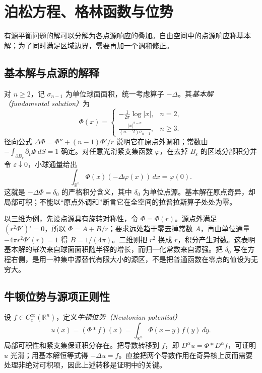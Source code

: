 \setcounter{chapter}{10} %
\chapter{泊松方程、格林函数与位势}
\label{chap:green}

有源平衡问题的解可以分解为各点源响应的叠加。自由空间中的点源响应称基本解；为了同时满足区域边界，需要再加一个调和修正。

\section{基本解与点源的解释}
对 $n\ge2$，记 $\sigma_{n-1}$ 为单位球面面积，统一考虑算子 $-\Delta$。其\emph{基本解（fundamental solution）}为
\begin{equation}
 \Phi(x)=\begin{cases}
 \displaystyle-\frac1{2\pi}\log|x|,&n=2,\\
 \displaystyle\frac{|x|^{2-n}}{(n-2)\sigma_{n-1}},&n\ge3.
 \end{cases}
 \label{eq:laplace-fundamental}
\end{equation}
径向公式 $\Delta\Phi=\Phi''+(n-1)\Phi'/r$ 说明它在原点外调和；常数由 $-\int_{\partial B_r}\partial_\nu\Phi\,dS=1$ 确定。对任意光滑紧支集函数 $\varphi$，在去掉 $B_\varepsilon$ 的区域分部积分并令 $\varepsilon\downarrow0$，小球通量给出
\[
 \int_{\mathbb R^n}\Phi(x)(-\Delta\varphi(x))\,dx=\varphi(0).
\]
这就是 $-\Delta\Phi=\delta_0$ 的严格积分含义，其中 $\delta_0$ 为单位点源。基本解在原点奇异，却局部可积；不能以“原点外调和”断言它在全空间的拉普拉斯算子处处为零。

以三维为例，先设点源具有旋转对称性，令 $\Phi=\Phi(r)$。源点外满足 $(r^2\Phi')'=0$，所以 $\Phi=A+B/r$；要求远处趋于零去掉常数 $A$，再由单位通量 $-4\pi r^2\Phi'(r)=1$ 得 $B=1/(4\pi)$。二维则把 $r^2$ 换成 $r$，积分产生对数。这表明基本解的幂次来自球面面积随半径的增长，而归一化常数来自源强。把 $\delta_0$ 写在方程右侧，是用一种集中源替代有限大小的源区，不是把普通函数在零点的值设为无穷大。

\section{牛顿位势与源项正则性}
设 $f\in C_c^\infty(\mathbb R^n)$，定义\emph{牛顿位势（Newtonian potential）}
\[
 u(x)=(\Phi*f)(x)=\int_{\mathbb R^n}\Phi(x-y)f(y)\,dy.
\]
局部可积性和紧支集保证积分存在。把导数转移到 $f$，即 $D^\alpha u=\Phi*D^\alpha f$，可证明 $u$ 光滑；用基本解恒等式得 $-\Delta u=f$。直接把两个导数作用在奇异核上反而需要处理非绝对可积项，因此上述转移是证明中的关键。

